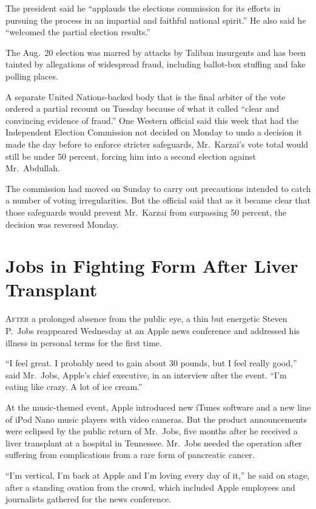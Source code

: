﻿\documentclass[12pt]{article}
\begin{document}
The president said he ``applauds the elections commission for its efforts in pursuing the process in
an impartial and faithful national spirit.'' He also said he ``welcomed the partial election
results.''

The Aug.~20 election was marred by attacks by Taliban insurgents and has been tainted by allegations
of widespread fraud, including ballot-box stuffing and fake polling places.

A separate United Nations-backed body that is the final arbiter of the vote ordered a partial
recount on Tuesday because of what it called ``clear and convincing evidence of fraud.'' One Western
official said this week that had the Independent Election Commission not decided on Monday to undo a
decision it made the day before to enforce stricter safeguards, Mr.~Karzai's vote total would still
be under 50 percent, forcing him into a second election against Mr.~Abdullah.

The commission had moved on Sunday to carry out precautions intended to catch a number of voting
irregularities. But the official said that as it became clear that those safeguards would prevent
Mr.~Karzai from surpassing 50 percent, the decision was reversed Monday.


\section{Jobs in Fighting Form After Liver Transplant}

\lettrine{A}{fter} a prolonged absence from the public eye, a thin but energetic Steven P.~Jobs
reappeared Wednesday at an Apple news conference and addressed his illness in personal terms for the
first time.

``I feel great. I probably need to gain about 30 pounds, but I feel really good,'' said Mr.~Jobs,
Apple's chief executive, in an interview after the event. ``I'm eating like crazy. A lot of ice
cream.''

At the music-themed event, Apple introduced new iTunes software and a new line of iPod Nano music
players with video cameras. But the product announcements were eclipsed by the public return of
Mr.~Jobs, five months after he received a liver transplant at a hospital in Tennessee. Mr.~Jobs
needed the operation after suffering from complications from a rare form of pancreatic cancer.

``I'm vertical, I'm back at Apple and I'm loving every day of it,'' he said on stage, after a
standing ovation\cite{ovation} from the crowd, which included Apple employees and journalists
gathered for the news conference.
\end{document}
